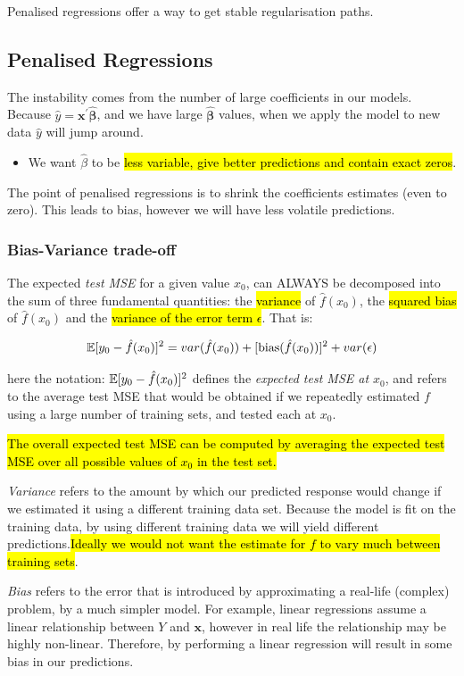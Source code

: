 \documentclass[11pt]{article}
\begin{document}
Penalised regressions offer a way to get stable regularisation paths.

\subsection{Penalised Regressions}

The instability comes from the number of large coefficients in our models. Because $\hat{y} = \mathbf{x^\prime}\bm{\hat{\beta}}$, and we have large $\bm{\hat{\beta}}$ values, when we apply the model to new data $\hat{y}$ will jump around.

\begin{itemize}
    \item We want $\hat{\beta}$ to be \hl{less variable, give better predictions and contain exact zeros}.
\end{itemize}

The point of penalised regressions is to shrink the coefficients estimates (even to zero). This leads to bias, however we will have less volatile predictions.

\subsubsection{Bias-Variance trade-off}

The expected \textit{test MSE} for a given value $x_0$, can ALWAYS be decomposed into the sum of three fundamental quantities: the \hl{variance} of $\hat{f}(x_0)$, the \hl{squared bias} of $\hat{f}(x_0)$ and the \hl{variance of the error term $\epsilon$}. That is:

\begin{equation}
\label{expected test mse}
    \mathbb{E}[y_0 - \hat{f}(x_0)]^2 = var(\hat{f}(x_0)) + [\text{bias}(\hat{f}(x_0))]^2 + var(\epsilon)
\end{equation}

here the notation: $ \mathbb{E}[y_0 - \hat{f}(x_0)]^2$ defines the \textit{expected test MSE at $x_0$}, and refers to the average test MSE that would be obtained if we repeatedly estimated $f$ using a large number of training sets, and tested each at $x_0$.

\hl{The overall expected test MSE can be computed by averaging the expected test MSE over all possible values of $x_0$ in the test set.}

\begin{mdframed}
    \textit{Variance} refers to the amount by which our predicted response would change if we estimated it using a different training data set. Because the model is fit on the training data, by using different training data we will yield different predictions.\hl{Ideally we would not want the estimate for $f$ to vary much between training sets}.

    \textit{Bias} refers to the error that is introduced by approximating a real-life (complex) problem, by a much simpler model. For example, linear regressions assume a linear relationship between $Y$ and $\mathbf{x}$, however in real life the relationship may be highly non-linear. Therefore, by performing a linear regression will result in some bias in our predictions.
\end{mdframed}
\end{document}
